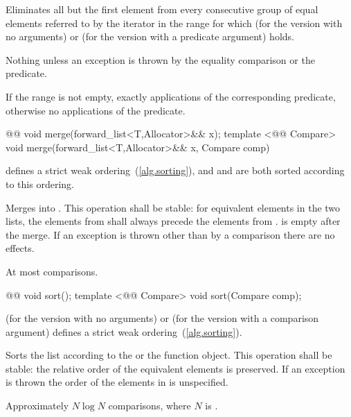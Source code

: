 \documentclass[american,twoside]{book}
\begin{document}
\begin{itemdescr}
\pnum
\effects Eliminates all but the first element from every consecutive group of equal elements referred to by the iterator  in the range  for which  (for the version with no arguments) or  (for the version with a predicate argument) holds.

\pnum
\throws Nothing unless an exception is thrown by the equality comparison or the predicate.

\pnum
\complexity If the range  is not empty, exactly  applications of the corresponding predicate, otherwise no applications of the predicate.
\end{itemdescr}

\begin{itemdecl}
@@ void merge(forward_list<T,Allocator>&& x);
template <@@ Compare> 
  void merge(forward_list<T,Allocator>&& x, Compare comp)
\end{itemdecl}

\begin{itemdescr}
\pnum
\requires {} defines a strict weak ordering~(\ref{alg.sorting}), and  and  are both sorted according to this ordering.

\pnum
\effects Merges  into . This operation shall be stable: for equivalent elements in the two lists, the elements from  shall always precede the elements from .  is empty after the merge. If an exception is thrown other than by a comparison there are no effects.

\pnum
\complexity At most  comparisons.
\end{itemdescr}

\begin{itemdecl}
@@ void sort();
template <@@ Compare> void sort(Compare comp);
\end{itemdecl}

\begin{itemdescr}
\pnum
\requires {} (for the version with no arguments) or  (for the version with a comparison argument) defines a strict weak ordering~(\ref{alg.sorting}).

\pnum
\effects Sorts the list according to the  or the  function object. This operation shall be stable: the relative order of the equivalent elements is preserved. If an exception is thrown the order of the elements in  is unspecified.

\pnum
\complexity Approximately $N \log N$ comparisons, where $N$ is .
\end{itemdescr}
\end{document}
